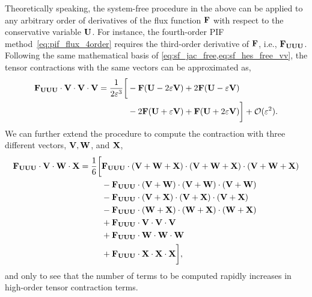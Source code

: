 Theoretically speaking, the system-free procedure in the above
can be applied to any arbitrary order of derivatives of the flux function \( \mathbf{F} \)
with respect to the conservative variable \( \mathbf{U} \). For instance,
the fourth-order PIF method~\cref{eq:pif_flux_4order}
requires the third-order derivative of \( \mathbf{F} \), i.e., \( \mathbf{F}_{\mathbf{U}\mathbf{U}\mathbf{U}} \).
Following the same mathematical basis of \cref{eq:sf_jac_free,eq:sf_hes_free_vv},
the tensor contractions with the same vectors can be approximated as,
\begin{equation}\label{eq:orig-sf-don}
    \begin{split}
        \mathbf{F}_{\mathbf{U} \mathbf{U} \mathbf{U}} \cdot \mathbf{V} \cdot \mathbf{V} \cdot \mathbf{V} = \frac{1}{2 \varepsilon^{3}}
        \bigg[& -\mathbf{F}(\mathbf{U} - 2 \varepsilon \mathbf{V}) + 2\mathbf{F}(\mathbf{U} - \varepsilon \mathbf{V}) \\
              & - 2\mathbf{F}(\mathbf{U} + \varepsilon \mathbf{V})+ \mathbf{F}(\mathbf{U} + 2 \varepsilon \mathbf{V})
        \bigg] + \mathcal{O} ( \varepsilon^{2} ).
    \end{split}
\end{equation}
We can further extend the procedure to compute the contraction
with three different vectors, \( \mathbf{V}, \mathbf{W} \), and \( \mathbf{X} \),
\begin{equation}\label{eq:orig-sf-don-vec}
    \begin{split}
        \mathbf{F}_{\mathbf{U} \mathbf{U} \mathbf{U}} \cdot \mathbf{V} \cdot \mathbf{W} \cdot \mathbf{X} = \frac{1}{6} \bigg[
            &\mathbf{F}_{\mathbf{U} \mathbf{U} \mathbf{U}} \cdot \left( \mathbf{V} + \mathbf{W} + \mathbf{X} \right) \cdot \left( \mathbf{V} + \mathbf{W} + \mathbf{X} \right) \cdot \left( \mathbf{V} + \mathbf{W} + \mathbf{X} \right) \\
            & -\mathbf{F}_{\mathbf{U} \mathbf{U} \mathbf{U}} \cdot \left( \mathbf{V} + \mathbf{W} \right) \cdot \left( \mathbf{V} + \mathbf{W} \right) \cdot \left( \mathbf{V} + \mathbf{W} \right) \\
            & -\mathbf{F}_{\mathbf{U} \mathbf{U} \mathbf{U}} \cdot \left( \mathbf{V} + \mathbf{X} \right) \cdot \left( \mathbf{V} + \mathbf{X} \right) \cdot \left( \mathbf{V} + \mathbf{X} \right) \\
            & -\mathbf{F}_{\mathbf{U} \mathbf{U} \mathbf{U}} \cdot \left( \mathbf{W} + \mathbf{X} \right) \cdot \left( \mathbf{W} + \mathbf{X} \right) \cdot \left( \mathbf{W} + \mathbf{X} \right) \\
            & + \mathbf{F}_{\mathbf{U} \mathbf{U} \mathbf{U}} \cdot \mathbf{V} \cdot \mathbf{V} \cdot \mathbf{V} \\
            & + \mathbf{F}_{\mathbf{U} \mathbf{U} \mathbf{U}} \cdot \mathbf{W} \cdot \mathbf{W} \cdot \mathbf{W} \\
            & + \mathbf{F}_{\mathbf{U} \mathbf{U} \mathbf{U}} \cdot \mathbf{X} \cdot \mathbf{X} \cdot \mathbf{X}
        \bigg],
    \end{split}
\end{equation}
and only to see that the number of terms to be computed 
rapidly increases in high-order tensor contraction terms.




